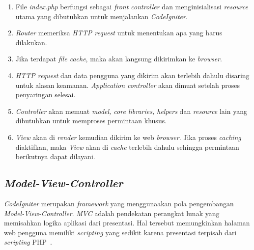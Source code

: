 \begin{enumerate}
	\item File \textit{index.php} berfungsi sebagai \textit{front controller} dan menginisialisasi \textit{resource} utama yang dibutuhkan untuk menjalankan \textit{CodeIgniter}.
	\item \textit{Router} memeriksa \textit{HTTP request} untuk menentukan apa yang harus dilakukan.
	\item Jika terdapat \textit{file cache}, maka akan langsung dikirimkan ke \textit{browser}.
	\item \textit{HTTP request} dan data pengguna yang dikirim akan terlebih dahulu disaring untuk alasan keamanan. \textit{Application controller} akan dimuat setelah proses penyaringan selesai.
	\item \textit{Controller} akan memuat \textit{model, core libraries, helpers} dan \textit{resource} lain yang dibutuhkan untuk memproses permintaan khusus.
	\item \textit{View} akan di \textit{render} kemudian dikirim ke web \textit{browser}. Jika proses \textit{caching} diaktifkan, maka \textit{View} akan di \textit{cache} terlebih dahulu sehingga permintaan berikutnya dapat dilayani.
\end{enumerate}

\subsection{\textit{Model-View-Controller}}
\textit{CodeIgniter} merupakan \textit{framework} yang menggunaakan pola pengembangan \textit{Model-View-Controller}. \textit{MVC} adalah pendekatan perangkat lunak yang memisahkan logika aplikasi dari presentasi. Hal tersebut memungkinkan halaman web pengguna memiliki \textit{scripting} yang sedikit karena presentasi terpisah dari \textit{scripting} PHP~\cite{bcit:17:cidoc}. \\

